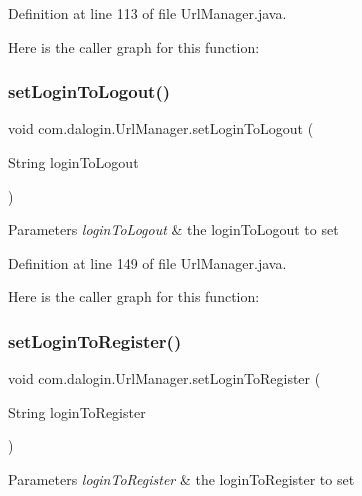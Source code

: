 Definition at line 113 of file Url\+Manager.\+java.

Here is the caller graph for this function\+:
\mbox{\label{classcom_1_1dalogin_1_1_url_manager_a1668934ed0cf34128e63c6b8e004182a}} 
\subsubsection{\texorpdfstring{set\+Login\+To\+Logout()}{setLoginToLogout()}}
{\footnotesize\ttfamily void com.\+dalogin.\+Url\+Manager.\+set\+Login\+To\+Logout (\begin{DoxyParamCaption}\item[{String}]{login\+To\+Logout }\end{DoxyParamCaption})}


\begin{DoxyParams}{Parameters}
{\em login\+To\+Logout} & the login\+To\+Logout to set \\
\hline
\end{DoxyParams}


Definition at line 149 of file Url\+Manager.\+java.

Here is the caller graph for this function\+:
\mbox{\label{classcom_1_1dalogin_1_1_url_manager_ab782533cae2700e5fe109d2b42f8383d}} 
\subsubsection{\texorpdfstring{set\+Login\+To\+Register()}{setLoginToRegister()}}
{\footnotesize\ttfamily void com.\+dalogin.\+Url\+Manager.\+set\+Login\+To\+Register (\begin{DoxyParamCaption}\item[{String}]{login\+To\+Register }\end{DoxyParamCaption})}


\begin{DoxyParams}{Parameters}
{\em login\+To\+Register} & the login\+To\+Register to set \\
\hline
\end{DoxyParams}


